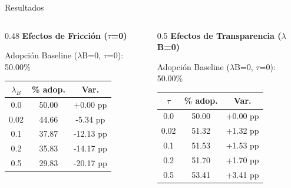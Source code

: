 \documentclass{beamer}
\begin{document}
\begin{frame}{Resultados}
  \begin{columns}[T]
    \begin{column}{0.48\textwidth}
      \centering
      \textbf{Efectos de Fricción ($\tau$=0)}
      
      \vspace{0.3em}
      
      \small{Adopción Baseline ($\lambda$B=0, $\tau$=0): 50.00\%}
      
      \vspace{0.5em}
      
      \begin{table}[h]
        \centering
        \begin{tabular}{|c|c|c|}
          \hline
          \textbf{$\lambda_B$} & \textbf{\% adop.} & \textbf{Var.} \\
          \hline
          0.0 & 50.00 & +0.00 pp \\
          \hline
          0.02 & 44.66 & -5.34 pp \\
          \hline
          0.1 & 37.87 & -12.13 pp \\
          \hline
          0.2 & 35.83 & -14.17 pp \\
          \hline
          0.5 & 29.83 & -20.17 pp \\
          \hline
        \end{tabular}
      \end{table}
    \end{column}
    
    \begin{column}{0.5\textwidth}
      \centering
      \textbf{Efectos de Transparencia ($\lambda$B=0)}
      
      \vspace{0.3em}
      
      \small{Adopción Baseline ($\lambda$B=0, $\tau$=0): 50.00\%}
      
      \vspace{0.5em}
      
      \begin{table}[h]
        \centering
        \begin{tabular}{|c|c|c|}
          \hline
          \textbf{$\tau$} & \textbf{\% adop.} & \textbf{Var.} \\
          \hline
          0.0 & 50.00 & +0.00 pp \\
          \hline
          0.02 & 51.32 & +1.32 pp \\
          \hline
          0.1 & 51.53 & +1.53 pp \\
          \hline
          0.2 & 51.70 & +1.70 pp \\
          \hline
          0.5 & 53.41 & +3.41 pp \\
          \hline
        \end{tabular}
      \end{table}
    \end{column}
  \end{columns}
\end{frame}
\end{document}
